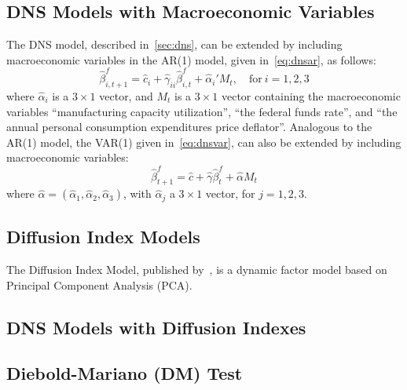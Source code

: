\subsection{DNS Models with Macroeconomic Variables}
\label{sec:dnsmv}
The DNS model, described in~\cref{sec:dns}, can be extended by including macroeconomic variables in the AR(1) model, given in~\cref{eq:dnsar}, as follows:
\begin{equation}
	\hat{\beta}_{i,t+1}^{f} = \hat{c}_i + \hat{\gamma}_{ii} \hat{\beta}_{i,t}^f + \hat{\alpha}_i' M_t, \quad \text{for}~i = 1,2,3
\end{equation}
where $\hat{\alpha}_i$ is a $3 \times 1$ vector, and $M_t$ is a $3 \times 1$ vector containing the macroeconomic variables \enquote{manufacturing capacity utilization}, \enquote{the federal funds rate}, and \enquote{the annual personal consumption expenditures price deflator}. Analogous to the AR(1) model, the VAR(1) given in~\cref{eq:dnsvar}, can also be extended by including macroeconomic variables:
\begin{equation}
	\hat{\beta}_{t+1}^{f} = \hat{c} + \hat{\gamma} \hat{\beta}_t^f + \hat{\alpha} M_t
\end{equation}
where $\hat{\alpha} = \left(\hat{\alpha}_1, \hat{\alpha}_2, \hat{\alpha}_3 \right)$, with $\hat{\alpha}_j$ a $3 \times 1$ vector, for $j = 1,2,3$.

\subsection{Diffusion Index Models}
\label{sec:dif}
The Diffusion Index Model, published by~\textcites[hereafter DIF]{Stock2002a,Stock2002b}, is a dynamic factor model based on Principal Component Analysis (PCA). 

\subsection{DNS Models with Diffusion Indexes}
\label{sec:dnsdif}

\subsection{Diebold-Mariano (DM) Test}
\label{sec:dmtest}
